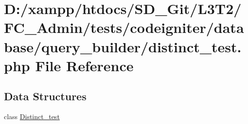 \hypertarget{_admin_2tests_2codeigniter_2database_2query__builder_2distinct__test_8php}{}\section{D\+:/xampp/htdocs/\+S\+D\+\_\+\+Git/\+L3\+T2/\+F\+C\+\_\+\+Admin/tests/codeigniter/database/query\+\_\+builder/distinct\+\_\+test.php File Reference}
\label{_admin_2tests_2codeigniter_2database_2query__builder_2distinct__test_8php}
\subsection*{Data Structures}
\begin{DoxyCompactItemize}
\item 
class \hyperlink{class_distinct__test}{Distinct\+\_\+test}
\end{DoxyCompactItemize}
